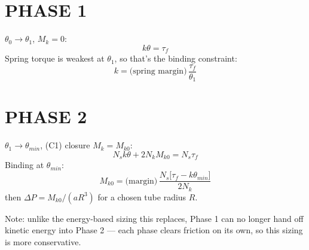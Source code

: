 \documentclass[11pt]{article}
\newcommand{\DP}{\Delta P}
\newcommand{\Mk}{M_k}
\begin{document}
\section{PHASE 1}

$\theta_0\to\theta_1$, $\Mk=0$:
\begin{equation}
k\theta = \tau_f
\label{eq:phase1}
\end{equation}
Spring torque is weakest at $\theta_1$, so that's the binding constraint:
\begin{equation}
\boxed{
k = \big(\text{spring margin}\big)\,\frac{\tau_f}{\theta_1}
}
\end{equation}

\section{PHASE 2}

$\theta_1\to\theta_{min}$, (C1) closure $\Mk=M_{k0}$:
\begin{equation}
N_s k\theta + 2N_k M_{k0} = N_s\tau_f
\label{eq:phase2}
\end{equation}
Binding at $\theta_{min}$:
\begin{equation}
\boxed{
M_{k0} = \big(\text{margin}\big)\,\frac{N_s\big[\tau_f - k\theta_{min}\big]}{2N_k}
}
\end{equation}
then $\DP = M_{k0}/(aR^3)$ for a chosen tube radius $R$.

Note: unlike the energy-based sizing this replaces, Phase 1 can no longer hand off kinetic energy into
Phase 2 — each phase clears friction on its own, so this sizing is more conservative.


\end{document}
